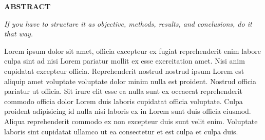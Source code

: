 \begin{center}
  {\Large{\bf{ABSTRACT}}}
\end{center}

\vspace{2em}


\textit{If you have to structure it as objective, methods, results, and conclusions, do it that way.}

Lorem ipsum dolor sit amet, officia excepteur ex fugiat reprehenderit enim labore culpa sint ad nisi Lorem pariatur mollit ex esse exercitation amet. Nisi anim cupidatat excepteur officia. Reprehenderit nostrud nostrud ipsum Lorem est aliquip amet voluptate voluptate dolor minim nulla est proident. Nostrud officia pariatur ut officia. Sit irure elit esse ea nulla sunt ex occaecat reprehenderit commodo officia dolor Lorem duis laboris cupidatat officia voluptate. Culpa proident adipisicing id nulla nisi laboris ex in Lorem sunt duis officia eiusmod. Aliqua reprehenderit commodo ex non excepteur duis sunt velit enim. Voluptate laboris sint cupidatat ullamco ut ea consectetur et est culpa et culpa duis.

\vspace{2em}

\clearpage
